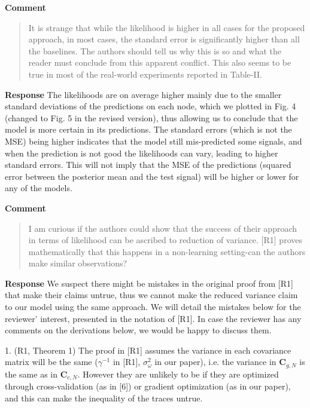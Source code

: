 \documentclass[11pt,onecolumn,journal]{IEEEtran}
\theoremstyle{definition}
\begin{document}
\textbf{Comment}
\begin{quote}
It is strange that while the likelihood is higher in all cases for the proposed approach, in most cases, the standard error is significantly higher than all the baselines. The authors should tell us why this is so and what the reader must conclude from this apparent conflict. This also seems to be true in most of the real-world experiments reported in Table-II.
\end{quote}

\textbf{Response}
The likelihoods are on average higher mainly due to the smaller standard deviations of the predictions on each node, which we plotted in Fig. 4 (changed to Fig. 5 in the revised version), thus allowing us to conclude that the model is more certain in its predictions. The standard errors (which is not the MSE) being higher indicates that the model still mis-predicted some signals, and when the prediction is not good the likelihoods can vary, leading to higher standard errors. This will not imply that the MSE of the predictions (squared error between the posterior mean and the test signal) will be higher or lower for any of the models.

\textbf{Comment}
\begin{quote}
I am curious if the authors could show that the success of their approach in terms of likelihood can be ascribed to reduction of variance. [R1] proves mathematically that this happens in a non-learning setting-can the authors make similar observations?
\end{quote}

\textbf{Response}
We suspect there might be mistakes in the original proof from [R1] that make their claims untrue, thus we cannot make the reduced variance claim to our model using the same approach. We will detail the mistakes below for the reviewer' interest, presented in the notation of [R1]. In case the reviewer has any comments on the derivations below, we would be happy to discuss them.

1. (R1, Theorem 1) The proof in [R1] assumes the variance in each covariance matrix will be the same ($\gamma^{-1}$ in [R1], $\sigma_\omega^2$ in our paper), i.e. the variance in $\mathbf{C}_{g,N}$ is the same as in $\mathbf{C}_{c,N}$. However they are unlikely to be if they are optimized through cross-validation (as in [6]) or gradient optimization (as in our paper), and this can make the inequality of the traces untrue.
\end{document}
